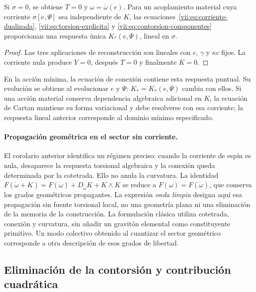 \begin{corollary}
\label{vii:cor:desacoplamiento-torsional}
Si \(\sigma=0\), se obtiene \(T=0\) y
\(\omega=\mathring\omega(e)\). Para un acoplamiento material cuya
corriente \(\sigma[e,\Psi]\) sea independiente de \(K\),
las ecuaciones~\eqref{vii:eq:corriente-dualizada},
\eqref{vii:eq:torsion-explicita} y
\eqref{vii:eq:contorsion-componentes} proporcionan una respuesta única
\(K_*(e,\Psi)\), lineal en \(\sigma\).
\end{corollary}
\begin{proof}
Las tres aplicaciones de reconstrucción son lineales con \(e\),
\(\gamma\) y \(\kappa c\) fijos. La corriente nula produce
\(Y=0\), después \(T=0\) y finalmente \(K=0\).
\end{proof}

En la acción mínima, la ecuación de conexión contiene esta respuesta
puntual. Su evolución se obtiene al evolucionar \(e\) y \(\Psi\):
\(K_*=K_*(e,\Psi)\) cambia con ellos. Si una acción material conserva
dependencia algebraica adicional en \(K\), la ecuación de Cartan
mantiene su forma variacional y debe resolverse con esa corriente;
la respuesta lineal anterior corresponde al dominio mínimo especificado.


\paragraph{Propagación geométrica en el sector sin corriente.}
El corolario anterior identifica un régimen preciso: cuando la corriente de
espín es nula, desaparece la respuesta torsional algebraica y la conexión
queda determinada por la cotetrada. Ello no anula la curvatura. La identidad
\(F(\mathring\omega+K)=F(\mathring\omega)+D_{\mathring\omega}K+K\wedge K\)
se reduce a \(F(\omega)=F(\mathring\omega)\), que conserva los grados
geométricos propagantes. La expresión \emph{onda limpia} designa aquí esa
propagación sin fuente torsional local, no una geometría plana ni una
eliminación de la memoria de la construcción. La formulación clásica utiliza
cotetrada, conexión y curvatura, sin añadir un gravitón elemental como
constituyente primitivo. Un modo colectivo obtenido al cuantizar el sector
geométrico corresponde a otra descripción de esos grados de libertad.

\subsection{Eliminación de la contorsión y contribución cuadrática}
\label{vii:subsec:respuesta-cuadratica}

